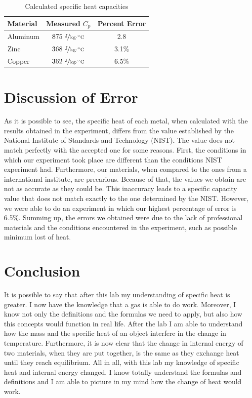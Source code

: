 \documentclass{article}
\begin{document}
\begin{table}[htbp]
\begin{center}
\footnotesize
\begin{tabular}{lcc}
\toprule
 Material  & Measured $C_p$ & Percent Error\\                                                      
\midrule
  
    Aluminum   & $875\   \nicefrac{ \text{J}}{\text{kg}\cdot {}^{\circ}\text{C}}$ &   2.8   \\
    Zinc     & $368\  \nicefrac{ \text{J}}{\text{kg}\cdot {}^{\circ}\text{C}}$  & 3.1\%   \\
     Copper     & $362\   \nicefrac{ \text{J}}{\text{kg}\cdot {}^{\circ}\text{C}}$   & 6.5\%   \\
    
\bottomrule
\end{tabular}
\end{center}
  \caption{Calculated specific heat capacities}
  \label{tab:font-sizes}
\end{table}


 \section{Discussion of Error}
 As it is possible to see, the specific heat of each metal, when calculated with the results obtained in the experiment, differs from the value established by the National Institute of Standards and Technology (NIST). The value does not match perfectly with the accepted one for some reasons. First, the conditions in which our experiment took place are different than the conditions NIST experiment had. Furthermore, our materials, when compared to the ones from a international institute, are precarious. Because of that, the values we obtain are not as accurate as they could be. This inaccuracy leads to a specific capacity value that does not match exactly to the one determined by the NIST. However, we were able to do an experiment in which our highest percentage of error is 6.5\%. Summing up, the errors we obtained were due to the lack of professional materials and the conditions encountered in the experiment, such as possible minimum lost of heat.
 
 \section{Conclusion}
It is possible to say that after this lab my understanding of specific heat is greater. I now have the knowledge that a gas is able to do work. Moreover, I know not only the definitions and the formulas we need to apply, but also how this concepts would function in real life. After the lab I am able to understand how the mass and the specific heat of an object interfere in the change in temperature. Furthermore, it is now clear that the change in internal energy of two materials, when they are put together, is the same as they exchange heat until they reach equilibrium. All in all, with this lab my knowledge of specific heat and internal energy changed. I know totally understand the formulas and definitions and I am able to picture in my mind how the change of heat would work. 
\end{document}
